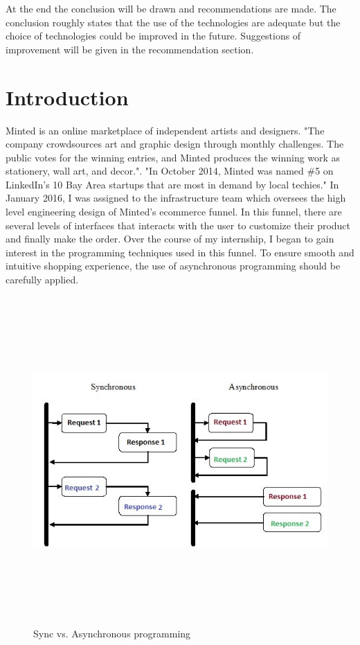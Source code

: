 \documentclass[12pt]{article}
\begin{document}
At the end the conclusion will be drawn and recommendations are made. The conclusion roughly states that the use of the technologies are adequate but the choice of technologies could be improved in the future. Suggestions of improvement will be given in the recommendation section.\\


\newpage

\tableofcontents
\newpage
\listoffigures
\newpage


\section{Introduction}

Minted is an online marketplace of independent artists and designers. "The company crowdsources art and graphic design through monthly challenges. The public votes for the winning entries, and Minted produces the winning work as stationery, wall art, and decor."\cite{mintedllc}. "In October 2014, Minted was named \#5 on LinkedIn's 10 Bay Area startups that are most in demand by local techies."\cite{mintedllc} In January 2016, I was assigned to the infrastructure team which oversees the high level engineering design of Minted's ecommerce funnel. In this funnel, there are several levels of interfaces that interacts with the user to customize their product and finally make the order. Over the course of my internship, I began to gain interest in the programming techniques used in this funnel. To ensure smooth and intuitive shopping experience, the use of asynchronous programming should be carefully applied.\\

\begin{figure}[ht!]
\centering
\includegraphics[width=12.5cm,height=12.5cm,keepaspectratio]{img/async.jpg}
\caption{Sync vs. Asynchronous programming}
\label{overflow}
\end{figure}
\end{document}
